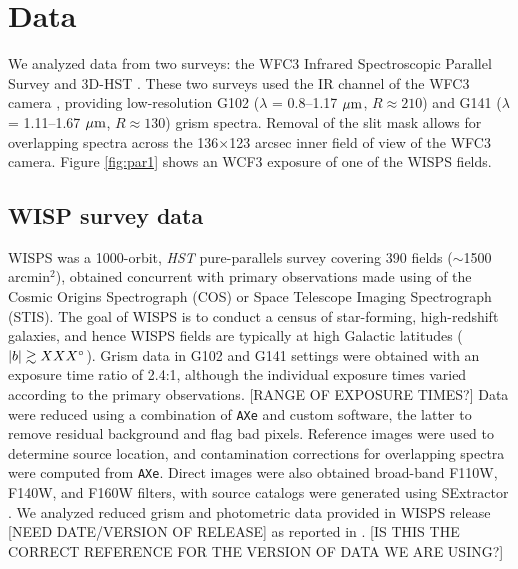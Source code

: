 \documentclass[manuscript]{aastex63}
\begin{document}
\section{Data}\label{sec:data}

We analyzed data from two surveys: 
the WFC3 Infrared Spectroscopic Parallel Survey \citep[WISPS;][]{2010ApJ...723..104A} and 
3D-HST \citep{Momcheva2016,2012ApJS..200...13B,Skelton2014}. These two surveys used the IR channel of the WFC3 camera \citep{doi:10.1117/12.789581}, providing low-resolution G102 ($\lambda$ = 0.8--1.17 $\mbox{$\mu$m}$, $R \approx 210$) and G141 ($\lambda$ = 1.11--1.67 $\mbox{$\mu$m}$, $R \approx 130$) grism spectra. 
Removal of the slit mask allows for overlapping spectra across the 136$\times$123 arcsec inner field of view of the WFC3 camera. Figure \ref{fig:par1} shows an WCF3 exposure of one of the WISPS fields.

\subsection{WISP survey data}
 WISPS was a 1000-orbit, {\em HST} pure-parallels survey covering 390 fields ($\sim$1500 arcmin$^2$), obtained concurrent with primary observations made using of the Cosmic Origins Spectrograph (COS) or Space Telescope Imaging Spectrograph (STIS). The goal of WISPS is to conduct a census of star-forming, high-redshift galaxies, and hence WISPS fields are typically at high Galactic latitudes ($|b| \gtrsim XXX\mbox{$^\circ$}$).
 Grism data in G102 and G141 settings were obtained with an exposure time ratio of 2.4:1, although the individual exposure times varied according to the primary observations. [RANGE OF EXPOSURE TIMES?]
 Data were reduced using a combination of \texttt{AXe} \citep{Kuntschner2013, Kummel2009} and custom software, the latter to remove residual background and flag bad pixels. 
 Reference images were used to determine source location, and contamination corrections for overlapping spectra were computed from \texttt{AXe}.
 Direct images were also obtained broad-band F110W, F140W, and F160W filters, with source catalogs were generated using SExtractor \citep{1996A&AS..117..393B}. 
 We analyzed reduced grism and photometric data provided in WISPS release [NEED DATE/VERSION OF RELEASE] as reported in \cite{2010ApJ...723..104A}.  [IS THIS THE CORRECT REFERENCE FOR THE VERSION OF DATA WE ARE USING?]
\end{document}
